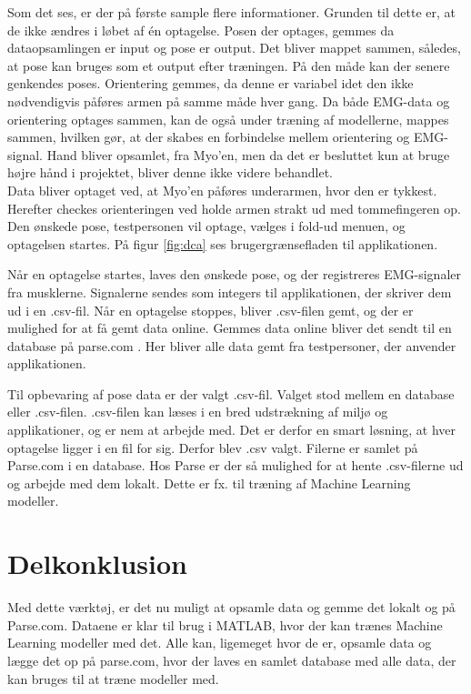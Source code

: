 Som det ses, er der på første sample flere informationer. Grunden til dette er, at de ikke ændres i løbet af én optagelse. Posen der optages, gemmes da dataopsamlingen er input og pose er output. Det bliver mappet sammen, således, at pose kan bruges som et output efter træningen. På den måde kan der senere genkendes poses. Orientering gemmes, da denne er variabel idet den ikke nødvendigvis påføres armen på samme måde hver gang. Da både EMG-data og orientering optages sammen, kan de også under træning af modellerne, mappes sammen, hvilken gør, at der skabes en forbindelse mellem orientering og EMG-signal. Hand bliver opsamlet, fra Myo'en, men da det er besluttet kun at bruge højre hånd i projektet, bliver denne ikke videre behandlet.\\
Data bliver optaget ved, at Myo'en påføres underarmen, hvor den er tykkest. Herefter checkes orienteringen ved holde armen strakt ud med tommefingeren op. Den ønskede pose, testpersonen vil optage, vælges i fold-ud menuen, og optagelsen startes. På figur \ref{fig:dca} ses brugergrænsefladen til applikationen.


Når en optagelse startes, laves den ønskede pose, og der registreres EMG-signaler fra musklerne. Signalerne sendes som integers til applikationen, der skriver dem ud i en .csv-fil. Når en optagelse stoppes, bliver .csv-filen gemt, og der er mulighed for at få gemt data online. Gemmes data online bliver det sendt til en database på parse.com \citep{RefWorks:11}. Her bliver alle data gemt fra testpersoner, der anvender applikationen.

Til opbevaring af pose data er der valgt .csv-fil. Valget stod mellem en database eller .csv-filen. .csv-filen kan læses i en bred udstrækning af miljø og applikationer, og er nem at arbejde med. Det er derfor en smart løsning, at hver optagelse ligger i en fil for sig. Derfor blev .csv valgt. Filerne er samlet på Parse.com i en database. Hos Parse er der så mulighed for at hente .csv-filerne ud og arbejde med dem lokalt. Dette er fx. til træning af Machine Learning modeller.

\section{Delkonklusion}
Med dette værktøj, er det nu muligt at opsamle data og gemme det lokalt og på Parse.com. Dataene er klar til brug i MATLAB, hvor der kan trænes Machine Learning modeller med det. Alle kan, ligemeget hvor de er, opsamle data og lægge det op på parse.com, hvor der laves en samlet database med alle data, der kan bruges til at træne modeller med. 